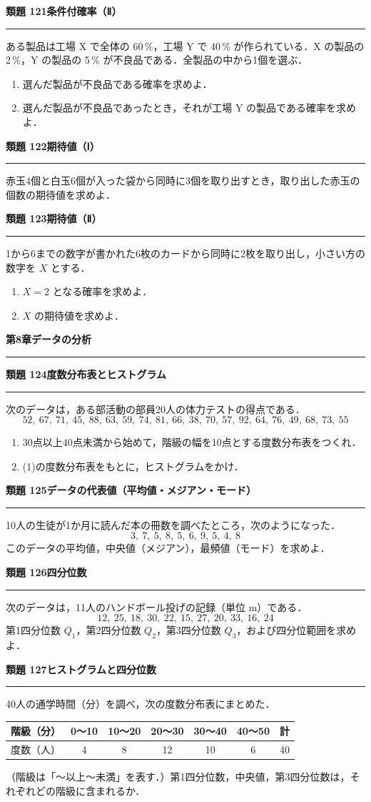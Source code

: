 \documentclass[a4paper,11pt]{ltjsarticle}
\newcommand{\mon}[2]{\Needspace{7\baselineskip}\vspace{10pt}%
  {\sffamily\bfseries 類題 #1\quad #2\par}\vspace{2pt}\hrule\vspace{4pt}}
\newcommand{\shou}[2]{\clearpage\markboth{#1\quad #2}{}%
  {\sffamily\bfseries\LARGE #1\quad #2\par}\vspace{2pt}\hrule height 1.2pt\vspace{4pt}}
\begin{document}
\mon{121}{条件付確率（Ⅱ）}
ある製品は工場 X で全体の 60\,\%，工場 Y で 40\,\% が作られている．X の製品の 2\,\%，Y の製品の 5\,\% が不良品である．全製品の中から1個を選ぶ．
\begin{enumerate}
\item 選んだ製品が不良品である確率を求めよ．
\item 選んだ製品が不良品であったとき，それが工場 Y の製品である確率を求めよ．
\end{enumerate}

\mon{122}{期待値（Ⅰ）}
赤玉4個と白玉6個が入った袋から同時に3個を取り出すとき，取り出した赤玉の個数の期待値を求めよ．

\mon{123}{期待値（Ⅱ）}
1から6までの数字が書かれた6枚のカードから同時に2枚を取り出し，小さい方の数字を $X$ とする．
\begin{enumerate}
\item $X=2$ となる確率を求めよ．
\item $X$ の期待値を求めよ．
\end{enumerate}

\shou{第8章}{データの分析}
\mon{124}{度数分布表とヒストグラム}
次のデータは，ある部活動の部員20人の体力テストの得点である．
\[52,\ 67,\ 71,\ 45,\ 88,\ 63,\ 59,\ 74,\ 81,\ 66,\ 38,\ 70,\ 57,\ 92,\ 64,\ 76,\ 49,\ 68,\ 73,\ 55\]
\begin{enumerate}
\item 30点以上40点未満から始めて，階級の幅を10点とする度数分布表をつくれ．
\item (1)の度数分布表をもとに，ヒストグラムをかけ．
\end{enumerate}

\mon{125}{データの代表値（平均値・メジアン・モード）}
10人の生徒が1か月に読んだ本の冊数を調べたところ，次のようになった．
\[3,\ 7,\ 5,\ 8,\ 5,\ 6,\ 9,\ 5,\ 4,\ 8\]
このデータの平均値，中央値（メジアン），最頻値（モード）を求めよ．

\mon{126}{四分位数}
次のデータは，11人のハンドボール投げの記録（単位 m）である．
\[12,\ 25,\ 18,\ 30,\ 22,\ 15,\ 27,\ 20,\ 33,\ 16,\ 24\]
第1四分位数 $Q_1$，第2四分位数 $Q_2$，第3四分位数 $Q_3$，および四分位範囲を求めよ．

\mon{127}{ヒストグラムと四分位数}
40人の通学時間（分）を調べ，次の度数分布表にまとめた．
\begin{center}
\renewcommand{\arraystretch}{1.15}
\begin{tabular}{c|ccccc|c}
階級（分） & 0〜10 & 10〜20 & 20〜30 & 30〜40 & 40〜50 & 計\\ \hline
度数（人） & 4 & 8 & 12 & 10 & 6 & 40
\end{tabular}
\end{center}
（階級は「〜以上〜未満」を表す．）第1四分位数，中央値，第3四分位数は，それぞれどの階級に含まれるか．
\end{document}
